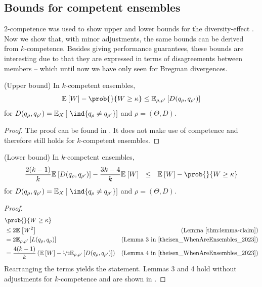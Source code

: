 \documentclass[../main.tex]{subfiles}
\begin{document}
\subsection{Bounds for competent ensembles}

$2$-competence was used to show upper and lower bounds for the diversity-effect \cite{theisen_WhenAreEnsembles_2023}. Now we show that, with minor adjustments, the same bounds can be derived from $k$-competence. 
Besides giving performance guarantees, these bounds are interesting due to that they are expressed in terms of disagreements between members -- which until now we have only seen for Bregman divergences.

\begin{theorem} 
    (Upper bound) In $k$-competent ensembles,
$$
\mathbb{E}_{}\left[ W \right] - \prob{}{W \geq \kappa} \leq \mathbb{E}_{\rho, \rho'}\left[ D(q_{\rho}, q_{\rho'}) \right]  
$$
for $D(q_{\rho}, q_{\rho'}) = \mathbb{E}_{X}\left[ ~\ind{q_{\rho} \not= q_{\rho'}} \right]$ and $\rho = (\Theta, D)$.
\label{thm:theisen-upper}
\end{theorem}
\begin{proof}
    The proof can be found in \cite{theisen_WhenAreEnsembles_2023}. It does not make use of competence and therefore still holds for $k$-competent ensembles.
\end{proof}

\begin{theorem} 
\label{thm:theisen-lower}
    (Lower bound) In $k$-competent ensembles,
$$
 \frac{2(k-1)}{k}\mathbb{E}_{}\left[ D(q_{\rho}, q_{\rho'}) \right]  - \frac{3k-4}{k}\mathbb{E}_{}\left[ W \right] 
 ~ ~ \leq ~ ~
\mathbb{E}_{}\left[ W \right] - \prob{}{W \geq \kappa} 
$$
for $D(q_{\rho}, q_{\rho'}) = \mathbb{E}_{X}\left[ ~\ind{q_{\rho} \not= q_{\rho'}} \right]$ and $\rho = (\Theta, D)$.
\end{theorem}
\begin{proof}
\begin{align*}
& \prob{}{W \geq \kappa}  \\
& \leq  2 \mathbb{E}_{}\left[ W^2 \right]  & \text{(Lemma \ref{thm:lemma-claim})}   \\
& =  2\mathbb{E}_{\rho, \rho'}\left[ L(q_{\rho}, q_{\rho_{}}) \right]  & \text{(Lemma 3 in \cite{theisen_WhenAreEnsembles_2023})} \\
& = \frac{4(k-1)}{k} \left(  \mathbb{E}_{}\left[ W  \right] - \nicefrac{1}{2} \mathbb{E}_{\rho, \rho'}\left[ D(q_{\rho}, q_{\rho'}) \right]    \right) & \text{(Lemma 4 in \cite{theisen_WhenAreEnsembles_2023})} 
\end{align*}
Rearranging the terms yields the statement.
Lemmas 3 and 4 hold without adjustments for $k$-competence and are shown in \cite{theisen_WhenAreEnsembles_2023}.
\end{proof}
\end{document}
